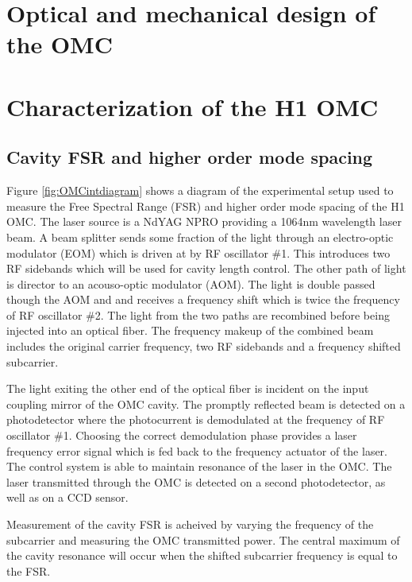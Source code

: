 \section{Optical and mechanical design of the OMC}

\section{Characterization of the H1 OMC}

\subsection{Cavity FSR and higher order mode spacing}


Figure \ref{fig:OMCintdiagram} shows a diagram of the experimental setup used to measure the Free Spectral Range (FSR) and higher order mode spacing of the H1 OMC. %
The laser source is a NdYAG NPRO providing a 1064nm wavelength laser beam. %
A beam splitter sends some fraction  of the light through an electro-optic modulator (EOM) which is driven at by RF oscillator \#1. %
This introduces two RF sidebands which will be used for cavity length control. %
The other path of light is director to an acouso-optic modulator (AOM). %
The light is double passed though the AOM and and receives a frequency shift which is twice the frequency of RF oscillator \#2. %
The light from the two paths are recombined before being injected into an optical fiber. %
The frequency makeup of the combined beam includes the original carrier frequency, two RF sidebands and a frequency shifted subcarrier.

The light exiting the other end of the optical fiber is incident on the input coupling mirror of the OMC cavity. %
The promptly reflected beam is detected on a photodetector where the photocurrent is demodulated at the frequency of RF oscillator \#1. %
Choosing the correct demodulation phase provides a laser frequency error signal which is fed back to the frequency actuator of the laser. %
The control system is able to maintain resonance of the laser in the OMC. %
The laser transmitted through the OMC is detected on a second photodetector, as well as on a CCD sensor.

Measurement of the cavity FSR is acheived by varying the frequency of the subcarrier and measuring the OMC transmitted power. %
The central maximum of the cavity resonance will occur when the shifted subcarrier frequency is equal to the FSR.

